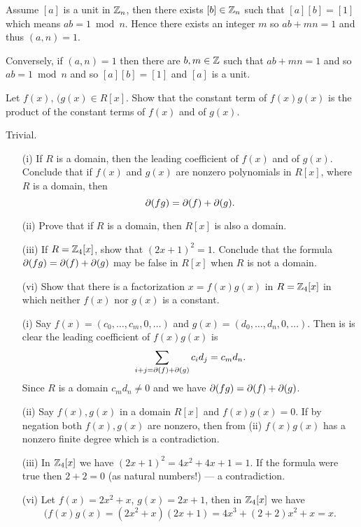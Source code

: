 \begin{myenumerate}
Assume \([a]\) is a unit in \(\mathbb{Z}_n\), then there exists \([b]\in \mathbb{Z}_n\)
such that \([a][b]=[1]\) which means \(ab=1\bmod n\).
Hence there exists an integer $m$ so \(ab+mn=1\) and thus \((a,n)=1\).

Conversely, if \((a,n)=1\) then there are \(b,m\in\mathbb{Z}\) such that
\(ab+mn=1\) and so \(ab=1\bmod n\) and so \([a][b]=[1]\) and \([a]\)
is a unit.

\item
\begin{excopy}
Let \(f(x),\, (g(x) \in R[x]\). Show that the constant term of
\(f(x)g(x)\)  is the product of the constant terms of
\(f(x)\) and of \(g(x)\).
\end{excopy}

Trivial.

\item
\begin{excopy}
\begin{itemize}
 \item[(i)]
   If $R$ is a domain, then the leading coefficient of
   \(f(x)\) and of \(g(x)\). Conclude that if
   \(f(x)\) and \(g(x)\) are nonzero polynomials in \(R[x]\),
   where $R$ is a domain, then
     \[\partial(fg)=\partial(f) + \partial(g).\]
 \item[(ii)]
   Prove that if $R$ is a domain, then \(R[x]\) is also a domain.
 \item[(iii)] \label{ex:2xp1}
   If \(R = \mathbb{Z}_4[x]\), show that \((2x+1)^2=1\).
   Conclude that the formula
   \(\partial(fg)=\partial(f)+\partial(g)\) may be false in \(R[x]\) when $R$
   is not a domain.
 \item[(vi)]
   Show that there is a factorization \(x=f(x)g(x)\) in
   \(R=\mathbb{Z}_4[x]\) in which neither \(f(x)\) nor \(g(x)\) is a constant.

\end{itemize}
\end{excopy}

\begin{itemize}
 \item[(i)]
   Say \(f(x)=(c_0,\ldots,c_m,0,\ldots)\)
   and \(g(x)=(d_0,\ldots,d_n,0,\ldots)\).
   Then is is clear the leading coefficient of
   \(f(x)g(x)\) is
   \[\sum_{i+j=\partial(f)+\partial(g)} c_i d_j = c_m d_n.\]
   Since $R$ is a domain \(c_m d_n\neq 0\)
   and we have \(\partial(fg)=\partial(f) + \partial(g)\).
 \item[(ii)]
   Say \(f(x), g(x)\) in a domain \(R[x]\) and \(f(x)g(x)=0\).
   If by negation both \(f(x), g(x)\) are nonzero, then
   from (ii) \(f(x)g(x)\) has a nonzero finite degree which is
   a contradiction.
 \item[(iii)]
   In \(\mathbb{Z}_4[x]\) we have \((2x+1)^2=4x^2+4x+1=1\).
   If the formula were true then \(2+2=0\) (as natural numbers!)
   --- a contradiction.
 \item[(vi)]
   Let \(f(x)=2x^2+x\), \(g(x)=2x+1\), then
   in \(\mathbb{Z}_4[x]\) we have \[(f(x)g(x)=(2x^2+x)(2x+1)=4x^3+(2+2)x^2+x=x.\]
\end{itemize}


\end{myenumerate}
